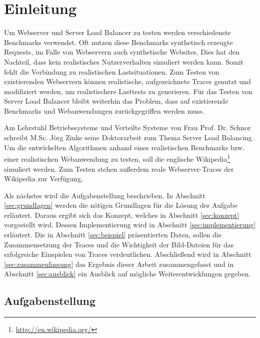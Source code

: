 \section{Einleitung}
\label{sec:einleitung}

Um Webserver und Server Load Balancer zu testen werden verschiedenste Benchmarks verwendet. Oft nutzen diese Benchmarks synthetisch erzeugte Requests, im Falle von Webservern auch synthetische Websites. Dies hat den Nachteil, dass kein realistisches Nutzerverhalten simuliert werden kann. Somit fehlt die Verbindung zu realistischen Lastsituationen. Zum Testen von existierenden Webservern können realistische, aufgezeichnete Traces genutzt und modifiziert werden, um realistischere Lasttests zu generieren. Für das Testen von Server Load Balancer bleibt weiterhin das Problem, dass auf existierende Benchmarks und Webanwendungen zurückgegriffen werden muss. 

Am Lehrstuhl Betriebssysteme und Verteilte Systeme von Frau Prof. Dr. Schnor
schreibt M.Sc. Jörg Zinke seine Doktorarbeit zum Thema Server Load Balancing. Um die entwickelten Algorithmen anhand eines realistischen Benchmarks bzw. einer realistischen Webanwendung zu testen, soll die englische Wikipedia\footnote{\url{http://en.wikipedia.org/}} simuliert werden. Zum Testen stehen außerdem reale Webserver-Traces der Wikipedia zur Verfügung.

Als nächstes wird die Aufgabenstellung beschrieben. In Abschnitt \ref{sec:grundlagen} werden die nötigen Grundlagen für die Lösung der Aufgabe erläutert. Daraus ergibt sich das Konzept, welches in Abschnitt \ref{sec:konzept} vorgestellt wird. Dessen Implementierung wird in Abschnitt \ref{sec:implementierung} erläutert. Die in Abschnitt \ref{sec:beispiel} präsentierten Daten, sollen die Zusammensetzung der Traces und die Wichtigkeit der Bild-Dateien für das erfolgreiche Einspielen von Traces verdeutlichen. Abschließend wird in Abschnitt \ref{sec:zusammenfassung} das Ergebnis dieser Arbeit zusammengefasst und in Abschnitt \ref{sec:ausblick} ein Ausblick auf mögliche Weiterentwicklungen gegeben.

\subsection{Aufgabenstellung}
\label{sec:aufgabestellung}

